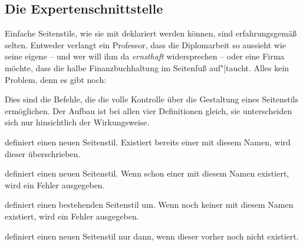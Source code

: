 \subsection{Die Expertenschnittstelle}\label{sec:scrpage-de.UI.expert}
Einfache Seitenstile, wie sie mit  deklariert
werden können, sind erfahrungsgemäß selten.
Entweder verlangt ein Professor, dass die Diplomarbeit so aussieht
wie seine eigene -- und wer will ihm da \emph{ernsthaft} widersprechen --
oder eine Firma möchte, dass die halbe Finanzbuchhaltung im
Seitenfuß auf"|taucht. Alles kein Problem, denn es gibt noch:
\begin{Declaration}
\end{Declaration}%
Dies sind die Befehle, die die volle Kontrolle über die Gestaltung
eines Seitenstils ermöglichen. Der Aufbau ist bei allen vier
Definitionen gleich, sie unterscheiden sich nur hinsichtlich
der Wirkungsweise.
\begin{labeling}[\ --]{}
\item[\Macro{defpagestyle}] definiert einen neuen Seitenstil.  Existiert
  bereits einer mit diesem Namen, wird dieser überschrieben.
\item[\Macro{newpagestyle}] definiert einen neuen Seitenstil. Wenn schon einer
  mit diesem Namen existiert, wird ein Fehler ausgegeben.
\item[\Macro{renewpagestyle}] definiert einen bestehenden Seitenstil um. Wenn
  noch keiner mit diesem Namen existiert, wird ein Fehler ausgegeben.
\item[\Macro{providepagestyle}] definiert einen neuen Seitenstil nur dann,
  wenn dieser vorher noch nicht existiert.
\end{labeling}

